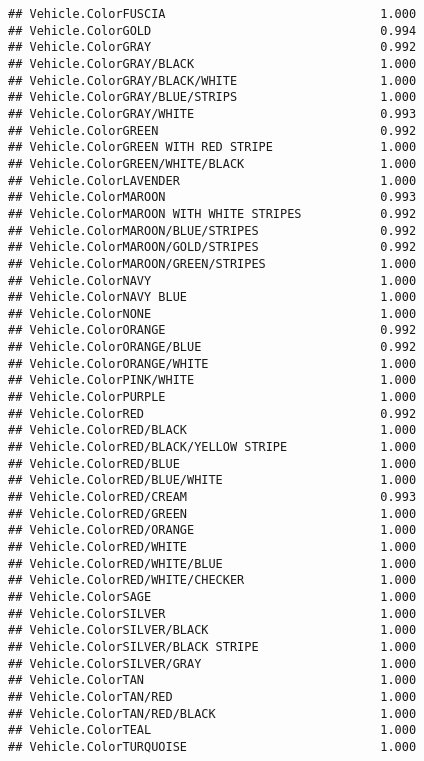 \documentclass[
]{article}
\begin{document}
\begin{verbatim}
## Vehicle.ColorFUSCIA                              1.000
## Vehicle.ColorGOLD                                0.994
## Vehicle.ColorGRAY                                0.992
## Vehicle.ColorGRAY/BLACK                          1.000
## Vehicle.ColorGRAY/BLACK/WHITE                    1.000
## Vehicle.ColorGRAY/BLUE/STRIPS                    1.000
## Vehicle.ColorGRAY/WHITE                          0.993
## Vehicle.ColorGREEN                               0.992
## Vehicle.ColorGREEN WITH RED STRIPE               1.000
## Vehicle.ColorGREEN/WHITE/BLACK                   1.000
## Vehicle.ColorLAVENDER                            1.000
## Vehicle.ColorMAROON                              0.993
## Vehicle.ColorMAROON WITH WHITE STRIPES           0.992
## Vehicle.ColorMAROON/BLUE/STRIPES                 0.992
## Vehicle.ColorMAROON/GOLD/STRIPES                 0.992
## Vehicle.ColorMAROON/GREEN/STRIPES                1.000
## Vehicle.ColorNAVY                                1.000
## Vehicle.ColorNAVY BLUE                           1.000
## Vehicle.ColorNONE                                1.000
## Vehicle.ColorORANGE                              0.992
## Vehicle.ColorORANGE/BLUE                         0.992
## Vehicle.ColorORANGE/WHITE                        1.000
## Vehicle.ColorPINK/WHITE                          1.000
## Vehicle.ColorPURPLE                              1.000
## Vehicle.ColorRED                                 0.992
## Vehicle.ColorRED/BLACK                           1.000
## Vehicle.ColorRED/BLACK/YELLOW STRIPE             1.000
## Vehicle.ColorRED/BLUE                            1.000
## Vehicle.ColorRED/BLUE/WHITE                      1.000
## Vehicle.ColorRED/CREAM                           0.993
## Vehicle.ColorRED/GREEN                           1.000
## Vehicle.ColorRED/ORANGE                          1.000
## Vehicle.ColorRED/WHITE                           1.000
## Vehicle.ColorRED/WHITE/BLUE                      1.000
## Vehicle.ColorRED/WHITE/CHECKER                   1.000
## Vehicle.ColorSAGE                                1.000
## Vehicle.ColorSILVER                              1.000
## Vehicle.ColorSILVER/BLACK                        1.000
## Vehicle.ColorSILVER/BLACK STRIPE                 1.000
## Vehicle.ColorSILVER/GRAY                         1.000
## Vehicle.ColorTAN                                 1.000
## Vehicle.ColorTAN/RED                             1.000
## Vehicle.ColorTAN/RED/BLACK                       1.000
## Vehicle.ColorTEAL                                1.000
## Vehicle.ColorTURQUOISE                           1.000

\end{verbatim}
\end{document}
